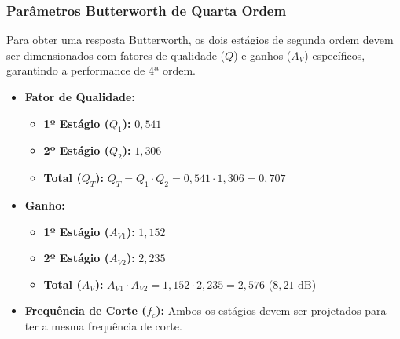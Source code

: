 
\subsubsection{Parâmetros Butterworth de Quarta Ordem}
Para obter uma resposta Butterworth, os dois estágios de segunda ordem devem ser dimensionados com fatores de qualidade ($Q$) e ganhos ($A_V$) específicos, garantindo a performance de 4ª ordem.

\begin{itemize}
    \item \textbf{Fator de Qualidade:}
    \begin{itemize}
        \item \textbf{1º Estágio ($Q_1$):} $0,541$
        \item \textbf{2º Estágio ($Q_2$):} $1,306$
        \item \textbf{Total ($Q_T$):} $Q_T = Q_1 \cdot Q_2 = 0,541 \cdot 1,306 = 0,707$
    \end{itemize}
    \item \textbf{Ganho:}
    \begin{itemize}
        \item \textbf{1º Estágio ($A_{V1}$):} $1,152$
        \item \textbf{2º Estágio ($A_{V2}$):} $2,235$
        \item \textbf{Total ($A_V$):} $A_{V1} \cdot A_{V2} = 1,152 \cdot 2,235 = 2,576$ ($8,21 \text{ dB}$)
    \end{itemize}
    \item \textbf{Frequência de Corte ($f_c$):} Ambos os estágios devem ser projetados para ter a mesma frequência de corte.
\end{itemize}